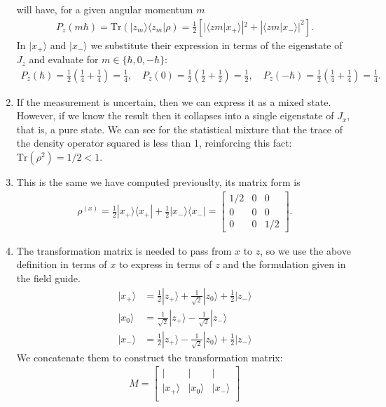 \documentclass[letterpaper,11pt,twoside]{article}
\newcommand{\ket}[1]{|#1\rangle}
\newcommand{\bra}[1]{\langle#1|}
\newcommand{\braket}[1]{\langle#1\rangle}
\begin{document}
\begin{enumerate}[itemsep=0pt,topsep=0pt,label=\alph*)]
  will have, for a given angular momentum $m$ 
  \begin{align*}
    P_z(m\hbar)=\text{Tr}(\ket{z_m}\bra{z_m}\rho)=\frac{1}{2}\left[|\braket{zm|x_+}|^2+|\braket{zm|x_-}|^2\right].
  \end{align*}
  In $\ket{x_+}$ and $\ket{x_-}$ we substitute their expression in terms of the eigenstate of $J_z$ and evaluate for $m\in\{\hbar,0,-\hbar\}$:
  \begin{align*}
    P_z(\hbar)=\frac{1}{2}\left(\frac{1}{4}+\frac{1}{4}\right)=\frac{1}{4},\quad P_z(0)=\frac{1}{2}\left(\frac{1}{2}+\frac{1}{2}\right)=\frac{1}{2},\quad P_z(-\hbar)=\frac{1}{2}\left(\frac{1}{4}+\frac{1}{4}\right)=\frac{1}{4}.
  \end{align*}
  \item If the measurement is uncertain, then we can express it as a mixed state. However, if we know the result then it collapses into a single eigenstate of $J_x$, that is, a pure state. We 
  can see for the statistical mixture that the trace of the density operator squared is less than 1, reinforcing this fact: $\text{Tr}(\rho^2)=1/2<1$.
  \item This is the same we have computed previouslty, its matrix form is 
  \begin{align*}
    \rho^{(x)}=\frac{1}{2}\ket{x_+}\bra{x_+}+\frac{1}{2}\ket{x_-}\bra{x_-}=\begin{bmatrix}
      1/2&0&0\\0&0&0\\0&0&1/2
    \end{bmatrix}.
  \end{align*}
  \item The transformation matrix is needed to pass from $x$ to $z$, so we use the above definition in terms of $x$ to express in terms of $z$ and the formulation given in the field guide.
  \begin{align*}
    \ket{x_+}&=\frac{1}{2}\ket{z_+}+\frac{1}{\sqrt{2}}\ket{z_0}+\frac{1}{2}\ket{z_-}\\
    \ket{x_0}&=\frac{1}{\sqrt{2}}\ket{z_+}-\frac{1}{\sqrt{2}}\ket{z_-}\\
    \ket{x_-}&=\frac{1}{2}\ket{z_+}-\frac{1}{\sqrt{2}}\ket{z_0}+\frac{1}{2}\ket{z_-}
  \end{align*}
  We concatenate them to construct the transformation matrix:
  \begin{align*}
    M=\begin{bmatrix}
      |&|&|\\
      \ket{x_+}&\ket{x_0}&\ket{x_-}\\

\end{bmatrix}
\end{align*}
\end{enumerate}
\end{document}
